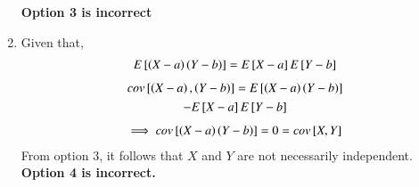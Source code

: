 \documentclass[journal,12pt,twocolumn]{IEEEtran}
\begin{document}
\begin{enumerate}
    \textbf{Option 3 is incorrect}
    \item Given that,
    \begin{align}
        E{}\left[\left(X-a\right)\left(Y-b\right)\right]=E{}\left[X-a\right]E{}\left[Y-b\right]
    \end{align}
    \begin{multline}
        cov{}\left[\left(X-a\right),\left(Y-b\right)\right]=
        E{}\left[\left(X-a\right)\left(Y-b\right)\right]\\-E{}\left[X-a\right]E{}\left[Y-b\right]
    \end{multline}
    \begin{align}
        \implies cov{}\left[\left(X-a\right)\left(Y-b\right)\right]=0=cov{}\left[X,Y\right]
    \end{align}
    From option 3, it follows that $X$ and $Y$ are not necessarily independent.\\
    \textbf{Option 4 is incorrect.}
\end{enumerate}
\end{document}

